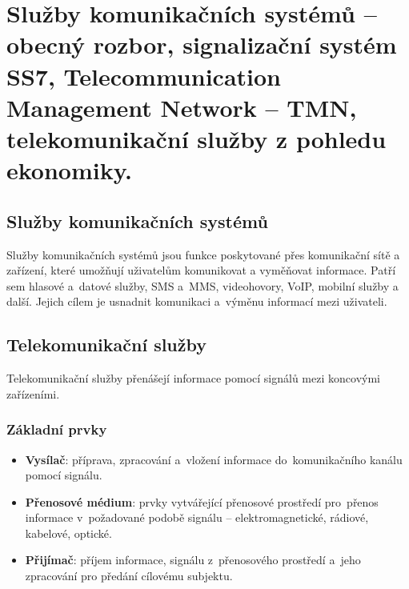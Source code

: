 \section{Služby komunikačních systémů -- obecný rozbor, signalizační systém SS7, Telecommunication Management Network -- TMN, telekomunikační služby z pohledu ekonomiky.}

\subsection{Služby komunikačních systémů}

Služby komunikačních systémů jsou funkce poskytované přes komunikační sítě a zařízení, které umožňují uživatelům komunikovat a vyměňovat informace.
Patří sem hlasové a~datové služby, SMS a~MMS, videohovory, VoIP, mobilní služby a další.
Jejich cílem je usnadnit komunikaci a~výměnu informací mezi uživateli.


\subsection{Telekomunikační služby}

Telekomunikační služby přenášejí informace pomocí signálů mezi koncovými zařízeními.

\subsubsection{Základní prvky}
\begin{itemize}
    \item
          \textbf{Vysílač}:
          příprava, zpracování a~vložení informace do~komunikačního kanálu pomocí signálu.
    \item
          \textbf{Přenosové médium}:
          prvky vytvářející přenosové prostředí pro~přenos informace v~požadované podobě signálu -- elektromagnetické, rádiové, kabelové, optické.
    \item
          \textbf{Přijímač}:
          příjem informace, signálu z~přenosového prostředí a~jeho zpracování pro předání cílovému subjektu.
\end{itemize}

